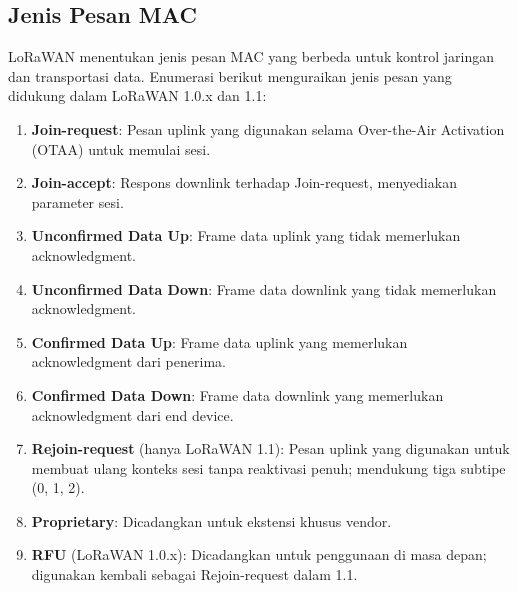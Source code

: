 \subsection{Jenis Pesan MAC}
LoRaWAN menentukan jenis pesan MAC yang berbeda untuk kontrol jaringan dan transportasi data. Enumerasi berikut menguraikan jenis pesan yang didukung dalam LoRaWAN 1.0.x dan 1.1:
\begin{enumerate}
    \item \textbf{Join-request}: Pesan uplink yang digunakan selama Over-the-Air Activation (OTAA) untuk memulai sesi.
    \item \textbf{Join-accept}: Respons downlink terhadap Join-request, menyediakan parameter sesi.
    \item \textbf{Unconfirmed Data Up}: Frame data uplink yang tidak memerlukan acknowledgment.
    \item \textbf{Unconfirmed Data Down}: Frame data downlink yang tidak memerlukan acknowledgment.
    \item \textbf{Confirmed Data Up}: Frame data uplink yang memerlukan acknowledgment dari penerima.
    \item \textbf{Confirmed Data Down}: Frame data downlink yang memerlukan acknowledgment dari end device.
    \item \textbf{Rejoin-request} (hanya LoRaWAN 1.1): Pesan uplink yang digunakan untuk membuat ulang konteks sesi tanpa reaktivasi penuh; mendukung tiga subtipe (0, 1, 2).
    \item \textbf{Proprietary}: Dicadangkan untuk ekstensi khusus vendor.
    \item \textbf{RFU} (LoRaWAN 1.0.x): Dicadangkan untuk penggunaan di masa depan; digunakan kembali sebagai Rejoin-request dalam 1.1.
\end{enumerate}
